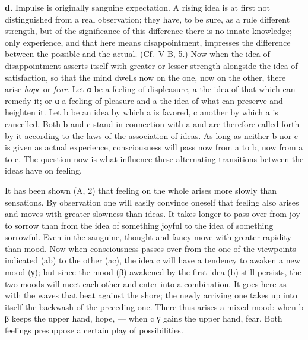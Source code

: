 \documentclass[12pt,a4paper]{book}
\newcommand{\opage}[1]{\marginnote{\footnotesize\textit{[#1]}}}
\begin{document}
\textbf{d.} Impulse is originally sanguine expectation. A rising idea is
at first not distinguished from a real observation; they have, to be
sure, as a rule different strength, but of the significance of this
difference there is no innate knowledge; only experience, and that here
means disappointment, impresses the difference between the possible and
the actual. (Cf.\ V B, 5.) Now when the idea of disappointment asserts
itself with greater or lesser strength alongside the idea of
satisfaction, so that the mind dwells now on the one, now on the other,
there arise \emph{hope} or \emph{fear}. Let α be a feeling of
displeasure, a the idea of that which can remedy it; or α a feeling of
pleasure and a the idea of what can
\opage{285}preserve and heighten it. Let b be an idea by which a is
favored, c another by which a is cancelled. Both b and c stand in
connection with a and are therefore called forth by it according to the
laws of the association of ideas. As long as neither b nor c is given as
actual experience, consciousness will pass now from a to b, now from a
to c. The question now is what influence these alternating transitions
between the ideas have on feeling.

It has been shown (A, 2) that feeling on the whole arises more slowly
than sensations. By observation one will easily convince oneself that
feeling also arises and moves with greater slowness than ideas. It takes
longer to pass over from joy to sorrow than from the idea of something
joyful to the idea of something sorrowful. Even in the sanguine, thought
and fancy move with greater rapidity than mood. Now when consciousness
passes over from the one of the viewpoints indicated (ab) to the other
(ac), the idea c will have a tendency to awaken a new mood (γ); but
since the mood (β) awakened by the first idea (b) still persists, the
two moods will meet each other and enter into a combination. It goes
here as with the waves that beat against the shore; the newly arriving
one takes up into itself the backwash of the preceding one. There thus
arises a mixed mood: when b β keeps the upper hand, hope, --- when c γ
gains the upper hand, fear. Both feelings presuppose a certain play of
possibilities.
\end{document}
